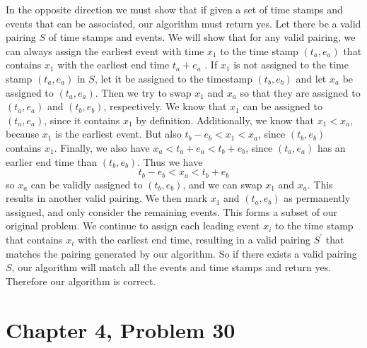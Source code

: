 \documentclass[12pt]{article}
\begin{document}
In the opposite direction we must show that if given a set of time stamps and events that can be associated,
our algorithm must return yes. Let there be a valid pairing \(S\) of time stamps and events. We will show that for
any valid pairing, we can always assign the earliest event with time \(x_1\) to the time stamp \((t_a,e_a)\) that contains \(x_1\)
with the earliest end time \(t_a+e_a\) . If \(x_1\) is not assigned to the time stamp \((t_a,e_a)\) in \(S\),
let it be assigned to the timestamp \((t_b,e_b)\) and let \(x_a\) be assigned to \((t_a,e_a)\). Then we try to swap
\(x_1\) and \(x_a\) so that they are assigned to \((t_a,e_a)\) and \((t_b,e_b)\), respectively. We know that \(x_1\) can be
assigned to \((t_a,e_a)\), since it contains \(x_1\) by definition. Additionally, we know that \(x_1<x_a\), because \(x_1\)
is the earliest event. But also \(t_b-e_b<x_1<x_a\), since \((t_b,e_b)\) contains \(x_1\). Finally, we also have
\(x_a<t_a+e_a<t_b+e_b\), since \((t_a,e_a)\) has an earlier end time than \((t_b,e_b)\). Thus we have
\[t_b-e_b<x_a<t_b+e_b\]
so \(x_a\) can be validly assigned to \((t_b,e_b)\), and we can swap \(x_1\) and \(x_a\). This results in another
valid pairing. We then mark \(x_1\) and \((t_a,e_b)\) as permanently assigned, and only consider the remaining events. This forms
a subset of our original problem. We continue to assign each leading event \(x_i\) to the time stamp that contains \(x_i\)
with the earliest end time, resulting in a valid pairing \(S^\prime\) that matches the pairing generated by our algorithm. So
if there exists a valid pairing \(S\), our algorithm will match all the events and time stamps and return yes. Therefore our
algorithm is correct.

\pagebreak

\section*{Chapter 4, Problem 30}
\end{document}
